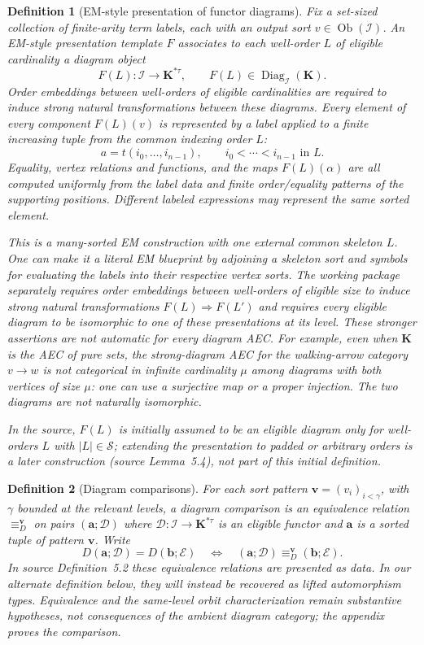\documentclass[11pt]{article}
\newcommand{\K}{\mathbf K}
\newcommand{\ba}{\mathbf{a}}
\newcommand{\bb}{\mathbf{b}}
\theoremstyle{plain}
\newtheorem{definition}{Definition}[section]
\begin{document}
\begin{definition}[EM-style presentation of functor diagrams]
\label{def:functor-em}
Fix a set-sized collection of finite-arity
term labels, each with an output sort
$v\in\operatorname{Ob}(\mathcal I)$.
An \emph{EM-style presentation template}
$F$ associates to each well-order $L$
of eligible cardinality a diagram object
\[
F(L):\mathcal I\longrightarrow\K^{*\tau},
\qquad
F(L)\in\operatorname{Diag}_{\mathcal I}(\K).
\]
Order embeddings between well-orders
of eligible cardinalities are required to induce strong natural
transformations between these diagrams.
Every element of every component
$F(L)(v)$ is represented by a label
applied to a finite increasing tuple
from the common indexing order $L$:
\[
a=t(i_0,\ldots,i_{n-1}),\qquad
i_0<\cdots<i_{n-1}\text{ in }L.
\]
Equality, vertex relations and functions,
and the maps $F(L)(\alpha)$ are all
computed uniformly from the label data
and finite order/equality patterns of
the supporting positions. Different
labeled expressions may represent the
same sorted element.

This is a many-sorted EM construction
with one \emph{external common skeleton}
$L$. One can make it a literal EM
blueprint by adjoining a skeleton sort
and symbols for evaluating the labels
into their respective vertex sorts.
The working package separately requires
order embeddings between well-orders of eligible size
to induce \emph{strong natural transformations}
$F(L)\Rightarrow F(L')$ and requires
every eligible diagram to be isomorphic
to one of these presentations at its level.
These stronger assertions are not
automatic for every diagram AEC. For example,
even when $\K$ is the AEC of pure sets,
the strong-diagram AEC for the walking-arrow category
$v\to w$ is not categorical in infinite
cardinality $\mu$ among diagrams with both
vertices of size $\mu$: one can use a
surjective map or a proper injection.
The two diagrams are not naturally isomorphic.

In the source, $F(L)$ is initially assumed
to be an eligible diagram only for
well-orders $L$ with $|L|\in\mathcal S$; extending
the presentation to padded or arbitrary
orders is a later construction
(source Lemma~5.4), not part of this
initial definition.
\end{definition}

\begin{definition}[Diagram comparisons]
For each sort pattern
$\mathbf v=(v_i)_{i<\gamma}$, with
$\gamma$ bounded at the relevant levels,
a \emph{diagram comparison} is an
equivalence relation $\equiv_D^{\mathbf v}$
on pairs $(\ba;\mathcal D)$ where
$\mathcal D:\mathcal I\to\K^{*\tau}$ is
an eligible functor and $\ba$ is
a sorted tuple of pattern $\mathbf v$.
Write
\[
D(\ba;\mathcal D)=D(\bb;\mathcal E)
\quad\Longleftrightarrow\quad
(\ba;\mathcal D)\equiv_D^{\mathbf v}
(\bb;\mathcal E).
\]
In source Definition~5.2 these equivalence relations are presented as
data. In our alternate definition below, they will instead be recovered
as lifted automorphism types. Equivalence and the same-level orbit
characterization remain substantive hypotheses, not consequences of the
ambient diagram category; the appendix proves the comparison.
\end{definition}
\end{document}
